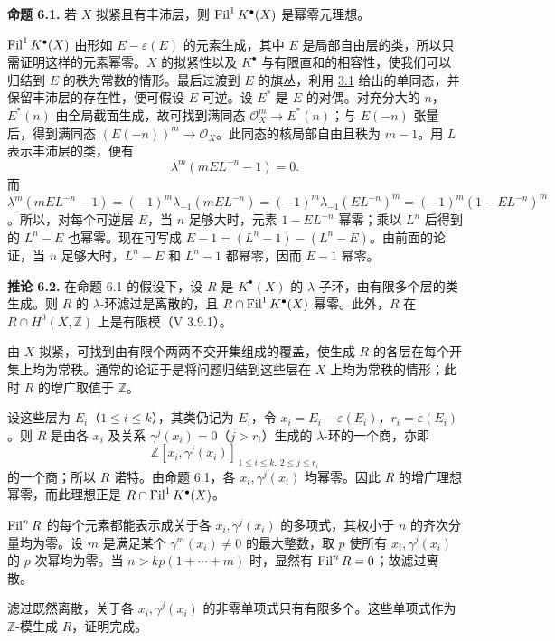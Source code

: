 \textbf{命题 6.1.} 若 \(X\) 拟紧且有丰沛层，则 \(\operatorname{Fil}^1 K^\bullet(X)\) 是幂零元理想。

\(\operatorname{Fil}^1 K^\bullet(X)\) 由形如 \(E-\varepsilon(E)\) 的元素生成，其中 \(E\) 是局部自由层的类，所以只需证明这样的元素幂零。\(X\) 的拟紧性以及 \(K^\bullet\) 与有限直和的相容性，使我们可以归结到 \(E\) 的秩为常数的情形。最后过渡到 \(E\) 的旗丛，利用 \hyperlink{sga6.e06.prop.3-1}{3.1} 给出的单同态，并保留丰沛层的存在性，便可假设 \(E\) 可逆。设 \(E^*\) 是 \(E\) 的对偶。对充分大的 \(n\)，\(E^*(n)\) 由全局截面生成，故可找到满同态 \(\mathcal O_X^m\to E^*(n)\)；与 \(E(-n)\) 张量后，得到满同态 \((E(-n))^m\to\mathcal O_X\)。此同态的核局部自由且秩为 \(m-1\)。用 \(L\) 表示丰沛层的类，便有
\[
   \lambda^m(mEL^{-n}-1)=0.
\]
而 \(\lambda^m(mEL^{-n}-1)=(-1)^m\lambda_{-1}(mEL^{-n})=(-1)^m\lambda_{-1}(EL^{-n})^m=(-1)^m(1-EL^{-n})^m\)。所以，对每个可逆层 \(E\)，当 \(n\) 足够大时，元素 \(1-EL^{-n}\) 幂零；乘以 \(L^n\) 后得到的 \(L^n-E\) 也幂零。现在可写成 \(E-1=(L^n-1)-(L^n-E)\)。由前面的论证，当 \(n\) 足够大时，\(L^n-E\) 和 \(L^n-1\) 都幂零，因而 \(E-1\) 幂零。

\textbf{推论 6.2.} 在命题 6.1 的假设下，设 \(R\) 是 \(K^\bullet(X)\) 的 \(\lambda\)-子环，由有限多个层的类生成。则 \(R\) 的 \(\lambda\)-环滤过是离散的，且 \(R\cap\operatorname{Fil}^1K^\bullet(X)\) 幂零。此外，\(R\) 在 \(R\cap H^0(X,\mathbb Z)\) 上是有限模（V 3.9.1）。

由 \(X\) 拟紧，可找到由有限个两两不交开集组成的覆盖，使生成 \(R\) 的各层在每个开集上均为常秩。通常的论证于是将问题归结到这些层在 \(X\) 上均为常秩的情形；此时 \(R\) 的增广取值于 \(\mathbb Z\)。

设这些层为 \(E_i\)（\(1\leq i\leq k\)），其类仍记为 \(E_i\)，令 \(x_i=E_i-\varepsilon(E_i)\)，\(r_i=\varepsilon(E_i)\)。则 \(R\) 是由各 \(x_i\) 及关系
\(\gamma^j(x_i)=0\)（\(j>r_i\)）生成的 \(\lambda\)-环的一个商，亦即
\[
 \mathbb Z[x_i,\gamma^j(x_i)]_{\,1\leq i\leq k,\ 2\leq j\leq r_i}
\]
的一个商；所以 \(R\) 诺特。由命题 6.1，各 \(x_i,\gamma^j(x_i)\) 均幂零。因此 \(R\) 的增广理想幂零，而此理想正是 \(R\cap\operatorname{Fil}^1K^\bullet(X)\)。

\(\operatorname{Fil}^nR\) 的每个元素都能表示成关于各 \(x_i,\gamma^j(x_i)\) 的多项式，其权小于 \(n\) 的齐次分量均为零。设 \(m\) 是满足某个 \(\gamma^m(x_i)\ne0\) 的最大整数，取 \(p\) 使所有 \(x_i,\gamma^j(x_i)\) 的 \(p\) 次幂均为零。当 \(n>kp(1+\cdots+m)\) 时，显然有 \(\operatorname{Fil}^nR=0\)；故滤过离散。

滤过既然离散，关于各 \(x_i,\gamma^j(x_i)\) 的非零单项式只有有限多个。这些单项式作为 \(\mathbb Z\)-模生成 \(R\)，证明完成。

